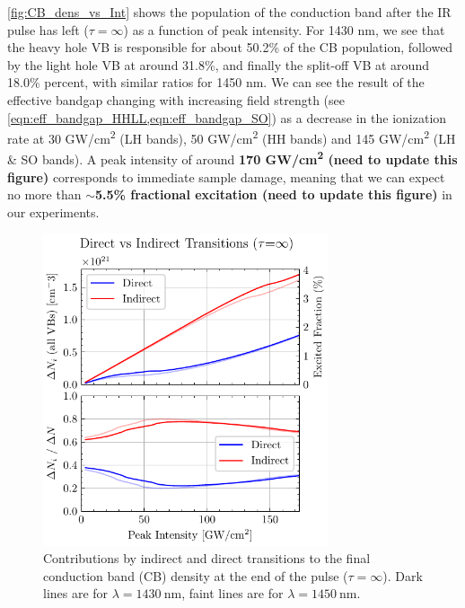 \cref{fig:CB_dens_vs_Int} shows the population of the conduction band after the IR pulse has left ($\tau = \infty$) as a function of peak intensity. For 1430 nm, we see that the heavy hole VB is responsible for about 50.2\% of the CB population, followed by the light hole VB at around 31.8\%, and finally the split-off VB at around 18.0\% percent, with similar ratios for 1450 nm. We can see the result of the effective bandgap changing with increasing field strength (see \cref{eqn:eff_bandgap_HHLL,eqn:eff_bandgap_SO}) as a decrease in the ionization rate at 30 GW/cm\textsuperscript{2} (LH bands), 50 GW/cm\textsuperscript{2} (HH bands) and 145 GW/cm\textsuperscript{2} (LH \& SO bands). A peak intensity of around \textbf{170 GW/cm\textsuperscript{2} (need to update this figure)} corresponds to immediate sample damage, meaning that we can expect no more than \textbf{$\sim$5.5\% fractional excitation (need to update this figure)} in our experiments.

\begin{figure}
	\centering
	\includegraphics[width=0.75\textwidth]{figures/chap4/Direct_vs_Indirect_Trans.pdf}
	\caption{Contributions by indirect and direct transitions to the final conduction band (CB) density at the end of the pulse ($\tau = \infty$). Dark lines are for $\lambda = 1430 \ \textrm{nm}$, faint lines are for $\lambda = 1450 \ \textrm{nm}$.}
	\label{fig:Direct_vs_Indirect_Trans}
\end{figure}

